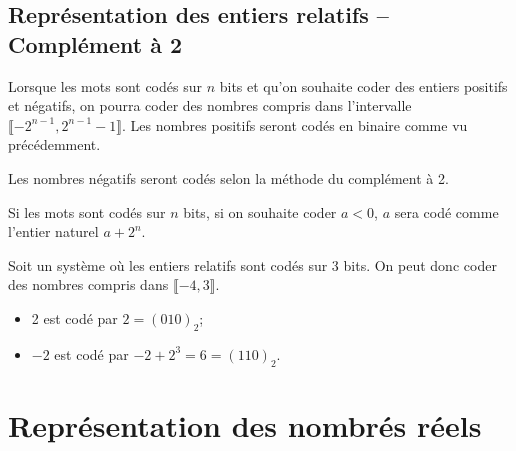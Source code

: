 \subsection{Représentation des entiers relatifs -- Complément à 2}

Lorsque les mots sont codés sur $n$ bits et qu'on souhaite coder des entiers positifs et négatifs, on pourra coder des nombres compris dans l'intervalle $\llbracket-2^{n-1},2^{n-1}-1\rrbracket$. Les nombres positifs seront codés en binaire comme vu précédemment. 

Les nombres négatifs seront codés selon la méthode du complément à 2. 
\begin{methode}
Si les mots sont codés sur $n$ bits, si on souhaite coder $a<0$, $a$ sera codé comme l'entier naturel $a+2^n$. 
\end{methode}

\begin{exemple} Soit un système où les entiers relatifs sont codés sur 3 bits. On peut donc coder des nombres compris dans $\llbracket-4,3\rrbracket$.
\begin{itemize}
\item 2 est codé par $2=(010)_2$;
\item $-2$ est codé par $-2+2^3 = 6 = (110)_2$.
\end{itemize}  
\end{exemple}

\section{Représentation des nombrés réels}